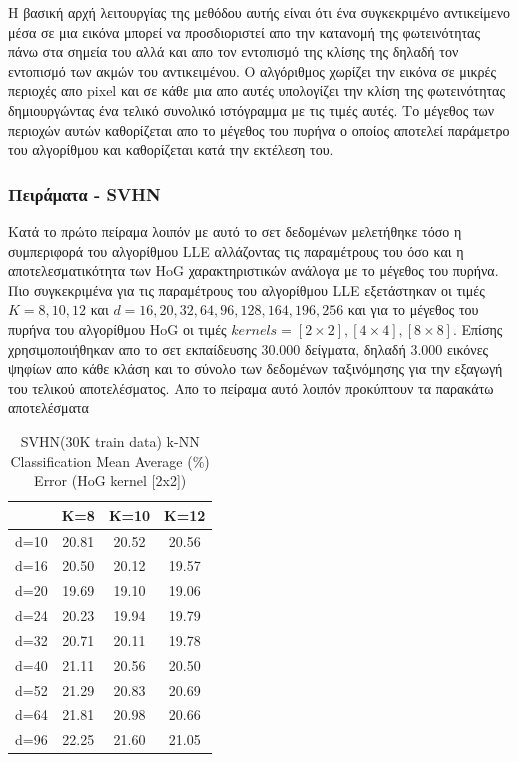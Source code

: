 \par
Η βασική αρχή λειτουργίας της μεθόδου αυτής είναι ότι ένα συγκεκριμένο αντικείμενο μέσα σε μια εικόνα μπορεί να προσδιοριστεί απο την κατανομή της φωτεινότητας πάνω στα σημεία του αλλά και απο τον εντοπισμό της κλίσης της δηλαδή τον εντοπισμό των ακμών του αντικειμένου. Ο αλγόριθμος χωρίζει την εικόνα σε μικρές περιοχές απο \textlatin{pixel} και σε κάθε μια απο αυτές υπολογίζει την κλίση της φωτεινότητας δημιουργώντας ένα τελικό συνολικό ιστόγραμμα με τις τιμές αυτές. Το μέγεθος των περιοχών αυτών καθορίζεται απο το μέγεθος του πυρήνα ο οποίος αποτελεί παράμετρο του αλγορίθμου και καθορίζεται κατά την εκτέλεση του.

\subsubsection{Πειράματα - \textlatin{SVHN}}
\par
Κατά το πρώτο πείραμα λοιπόν με αυτό το σετ δεδομένων μελετήθηκε τόσο η συμπεριφορά του αλγορίθμου \textlatin{LLE} αλλάζοντας τις παραμέτρους του όσο και η αποτελεσματικότητα των \textlatin{HoG} χαρακτηριστικών ανάλογα με το μέγεθος του πυρήνα. Πιο συγκεκριμένα για τις παραμέτρους του αλγορίθμου \textlatin{LLE} εξετάστηκαν οι τιμές $Κ=8,10,12$ και $d=16,20,32,64,96,128,164,196,256$ και για το μέγεθος του πυρήνα του αλγορίθμου \textlatin{HoG} οι τιμές $kernels=[2\times2],[4\times4],[8\times8]$. Επίσης χρησιμοποιήθηκαν απο το σετ εκπαίδευσης 30.000 δείγματα, δηλαδή 3.000 εικόνες ψηφίων απο κάθε κλάση και το σύνολο των δεδομένων ταξινόμησης για την εξαγωγή του τελικού αποτελέσματος. Απο το πείραμα αυτό λοιπόν προκύπτουν τα παρακάτω αποτελέσματα
\begin{table}[H]
\centering
\label{tab:table11}
\begin{tabular}{|c|c|c|c|}
\hline
 & K=8 & K=10 & K=12 \\
\hline
d=10 & 20.81 & 20.52 & 20.56 \\
d=16 & 20.50 & 20.12 & 19.57 \\
d=20 & 19.69 & 19.10 & 19.06 \\
d=24 & 20.23 & 19.94 & 19.79 \\
d=32 & 20.71 & 20.11 & 19.78 \\
d=40 & 21.11 & 20.56 & 20.50 \\
d=52 & 21.29 & 20.83 & 20.69 \\
d=64 & 21.81 & 20.98 & 20.66 \\
d=96 & 22.25 & 21.60 & 21.05 \\
\hline
\end{tabular}
\caption{SVHN(30K train data) k-NN Classification Mean Average (\%) Error (HoG kernel [2x2])}
\end{table}

